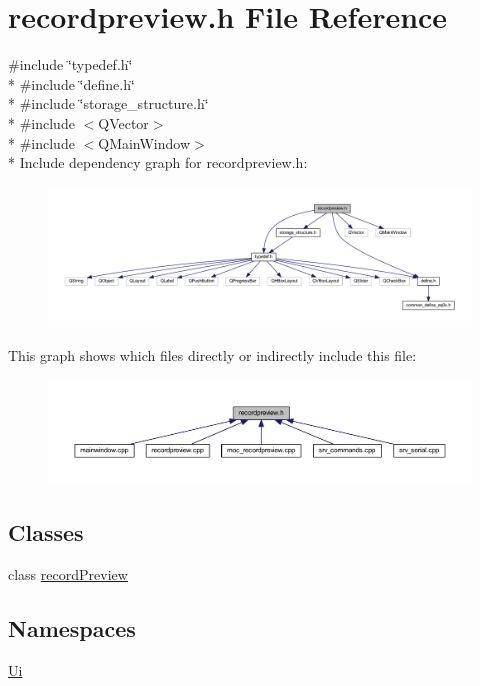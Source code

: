 \hypertarget{a00130}{\section{recordpreview.\+h File Reference}
\label{a00130}
}
{\ttfamily \#include \char`\"{}typedef.\+h\char`\"{}}\\*
{\ttfamily \#include \char`\"{}define.\+h\char`\"{}}\\*
{\ttfamily \#include \char`\"{}storage\+\_\+structure.\+h\char`\"{}}\\*
{\ttfamily \#include $<$Q\+Vector$>$}\\*
{\ttfamily \#include $<$Q\+Main\+Window$>$}\\*
Include dependency graph for recordpreview.\+h\+:
\nopagebreak
\begin{figure}[H]
\begin{center}
\leavevmode
\includegraphics[width=350pt]{d3/d93/a00341}
\end{center}
\end{figure}
This graph shows which files directly or indirectly include this file\+:
\nopagebreak
\begin{figure}[H]
\begin{center}
\leavevmode
\includegraphics[width=350pt]{d2/d45/a00342}
\end{center}
\end{figure}
\subsection*{Classes}
\begin{DoxyCompactItemize}
\item 
class \hyperlink{a00073}{record\+Preview}
\end{DoxyCompactItemize}
\subsection*{Namespaces}
\begin{DoxyCompactItemize}
\item 
 \hyperlink{a00145}{Ui}
\end{DoxyCompactItemize}
